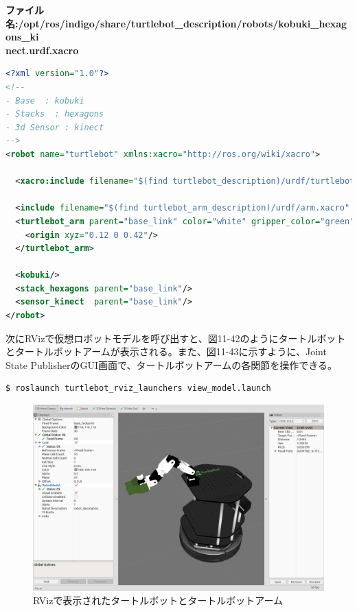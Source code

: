 \textbf{ファイル名:/opt/ros/indigo/share/turtlebot\_description/robots/kobuki\_hexagons\_ki\\nect.urdf.xacro}
\begin{lstlisting}[language=XML]
<?xml version="1.0"?>
<!--
- Base  : kobuki
- Stacks  : hexagons
- 3d Sensor : kinect
-->
<robot name="turtlebot" xmlns:xacro="http://ros.org/wiki/xacro">

  <xacro:include filename="$(find turtlebot_description)/urdf/turtlebot_library.urdf.xacro" />

  <include filename="$(find turtlebot_arm_description)/urdf/arm.xacro" />
  <turtlebot_arm parent="base_link" color="white" gripper_color="green" joints_vlimit="1.571" pan_llimit="-2.617" pan_ulimit="2.617">
    <origin xyz="0.12 0 0.42"/>
  </turtlebot_arm>

  <kobuki/>
  <stack_hexagons parent="base_link"/>
  <sensor_kinect  parent="base_link"/>
</robot>
\end{lstlisting}

次にRVizで仮想ロボットモデルを呼び出すと、図11-42のようにタートルボットとタートルボットアームが表示される。また、図11-43に示すように、Joint State PublisherのGUI画面で、タートルボットアームの各関節を操作できる。

\begin{lstlisting}[language=ROS]
$ roslaunch turtlebot_rviz_launchers view_model.launch
\end{lstlisting}

\begin{figure}[htp]
  \centering
  \includegraphics[width=12cm]{pictures/chapter11/pic_11_42.png}
  \caption{RVizで表示されたタートルボットとタートルボットアーム}
\end{figure}

